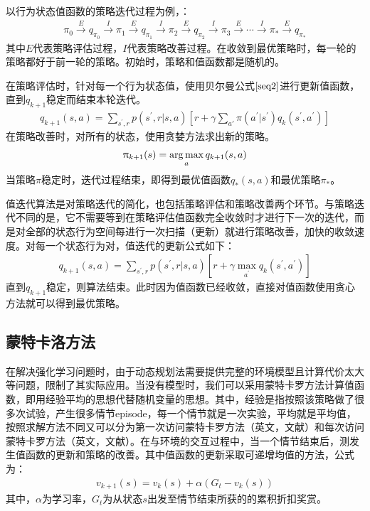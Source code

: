 以行为状态值函数的策略迭代过程为例，：
\begin{displaymath}
\begin{aligned}
\pi_{0}\xrightarrow{E}q_{\pi_0}\xrightarrow{I}\pi_{1}\xrightarrow{E}q_{\pi_1}\xrightarrow{I}\pi_{2}\xrightarrow{E}q_{\pi_2}\xrightarrow{I}\pi_{3}\xrightarrow{E} \cdots \xrightarrow{I}\pi_{*}\xrightarrow{E}q_{\pi_{*}}
\end{aligned}
\end{displaymath}
其中$E$代表策略评估过程，$I$代表策略改善过程。在收敛到最优策略时，每一轮的策略都好于前一轮的策略。初始时，策略和值函数都是随机的。

在策略评估时，针对每一个行为状态值，使用贝尔曼公式$\eqref{seq2}$进行更新值函数，直到$q_{k+1}$稳定而结束本轮迭代。
\begin{equation}
\begin{aligned}
q_{k+1}(s,a)=\sum_{s^{'},r}p(s^{'},r|s,a)[r+\gamma \sum_{a'}\pi(a^{'}|s^{'}) q_{k}(s^{'},a^{'})]
\end{aligned}
\end{equation}
在策略改善时，对所有的状态，使用贪婪方法求出新的策略。
\begin{equation}
\begin{aligned}
\uppi_{k+1}(s)=\operatorname*{arg\,max}_{a}q_{k+1}(s,a)
\end{aligned}
\end{equation}
当策略$\pi$稳定时，迭代过程结束，即得到最优值函数$q_{*}(s,a)$和最优策略$\pi_{*}$。

值迭代算法是对策略迭代的简化，也包括策略评估和策略改善两个环节。与策略迭代不同的是，它不需要等到在策略评估值函数完全收敛时才进行下一次的迭代，而是对全部的状态行为空间每进行一次扫描（更新）就进行策略改善，加快的收敛速度。对每一个状态行为对，值迭代的更新公式如下：
\begin{equation}
\begin{aligned}
q_{k+1}(s,a)=\sum_{s^{'},r}p(s^{'},r|s,a)[r+\gamma \max_{a^{'}} q_{k}(s^{'},a^{'})]
\end{aligned}
\end{equation}
直到$q_{k+1}$稳定，则算法结束。此时因为值函数已经收敛，直接对值函数使用贪心方法就可以得到最优策略。


\subsection{蒙特卡洛方法}
在解决强化学习问题时，由于动态规划法需要提供完整的环境模型且计算代价太大等问题，限制了其实际应用。当没有模型时，我们可以采用蒙特卡罗方法计算值函数，即用经验平均的思想代替随机变量的思想。其中，经验是指按照该策略做了很多次试验，产生很多情节episode，每一个情节就是一次实验，平均就是平均值，按照求解方法不同又可以分为第一次访问蒙特卡罗方法（英文，文献）和每次访问蒙特卡罗方法（英文，文献）。在与环境的交互过程中，当一个情节结束后，测发生值函数的更新和策略的改善。其中值函数的更新采取可递增均值的方法，公式为：
\begin{equation}
\begin{aligned}
v_{k+1}(s)=v_{k}(s)+ \alpha(G_{t}-v_{k}(s))
\end{aligned}
\end{equation}
其中，$\alpha$为学习率，$G_{t}$为从状态$s$出发至情节结束所获的的累积折扣奖赏。

